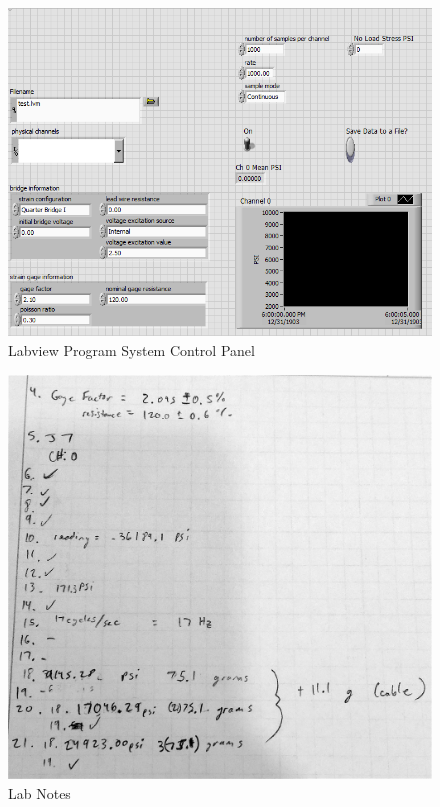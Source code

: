 \documentclass[12pt]{article}
\begin{document}
\bigskip
\bigskip

\begin{figure}[h!] %
   \centering
   \includegraphics[width=5in]{lab10bd.png} 
   \caption{Labview Program System Control Panel}
   \label{fig:example}
\end{figure}

\newpage

\begin{figure}[h!] %
   \centering
   \includegraphics[width=5in]{lab_10_notes.jpg} 
   \caption{Lab Notes}
   \label{fig:example}
\end{figure}
\end{document}
